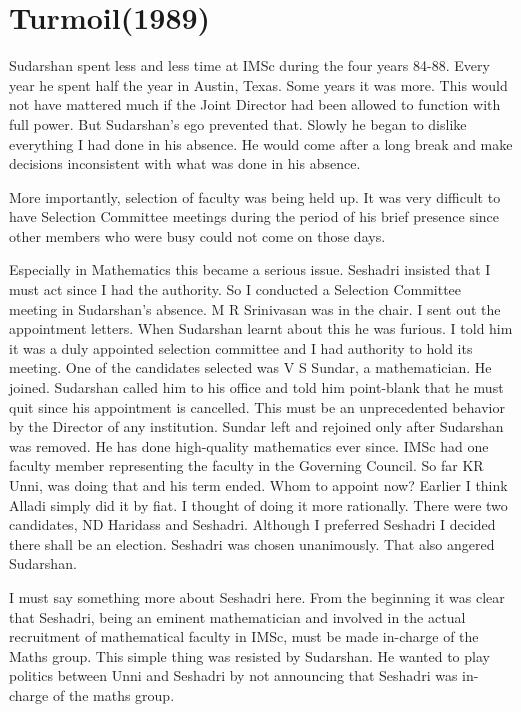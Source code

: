 \section*{Turmoil(1989)}

\vspace{-.3cm}

Sudarshan spent less and less time at IMSc during the four years 84-88. 
Every year he spent half the year in Austin, Texas. Some years it was 
more. This would not have mattered much if the Joint Director had been 
allowed to function with full power. But Sudarshan's ego prevented that. 
Slowly he began to dislike eve\-rything I had done in his absence. He 
would come after a long break and make decisions inconsistent with what 
was done in his absence.

More importantly, selection of faculty was being held up. It was very 
difficult to have Selection Committee meetings during the period of his 
brief presence since other members who were busy could not come on those 
days.

Especially in Mathematics this became a serious issue. Seshadri insisted 
that I must act since I had the authority. So I conducted a Selection 
Committee meeting in Sudarshan's absence. M R Srinivasan was in the 
chair. I sent out the appointment le\-tters. When Sudarshan learnt about 
this he was furious. I told him it was a duly appointed selection 
committee and I had autho\-rity to hold its meeting.
\vskip 1pt
One of the candidates selected was V S Sundar, a mathema\-tician. He 
joined. Sudarshan called him to his office and told him point-blank that 
he must quit since his appointment is cance\-lled. This must be an 
unprecedented behavior by the Director of any institution. Sundar left 
and rejoined only after Sudarshan was removed. He has done high-quality 
mathematics ever since.
\vskip 1pt
IMSc had one faculty member representing the faculty in the Governing 
Council. So far KR Unni, was doing that and his term ended. Whom to 
appoint now? Earlier I think Alladi simply did it by fiat. I thought of 
doing it more rationally. There were two candidates, ND Haridass and 
Seshadri. Although I preferred Seshadri I decided there shall be an 
election. Seshadri was chosen unanimously. That also angered Sudarshan.

\newpage

I must say something more about Seshadri here. From the beginning it was 
clear that Seshadri, being an eminent mathematician and involved in the 
actual recruitment of mathematical faculty in IMSc, must be made 
in-charge of the Maths group. This simple thing was resisted by 
Sudarshan. He wanted to play politics between Unni and Seshadri by not 
announcing that Seshadri was in-charge of the maths group.

